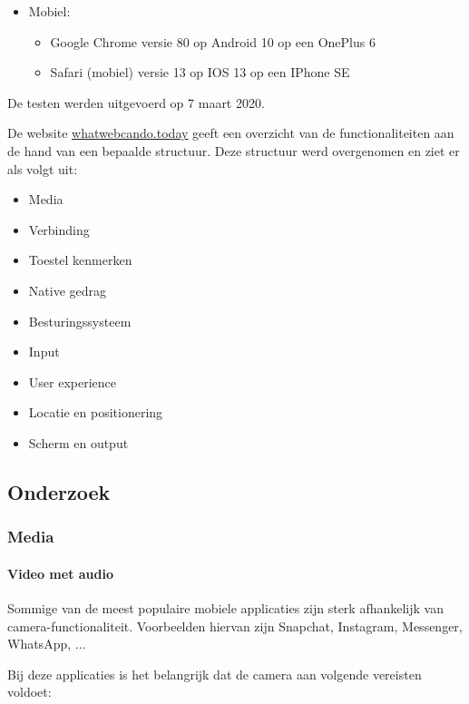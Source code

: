 \begin{itemize}
   \item Mobiel:
   \begin{itemize}
     \item Google Chrome versie 80 op Android 10 op een OnePlus 6
     \item Safari (mobiel) versie 13 op IOS 13 op een IPhone SE 
     
   \end{itemize}
\end{itemize}

De testen werden uitgevoerd op 7 maart 2020.

De website \href{https://whatwebcando.today/}{whatwebcando.today} geeft een overzicht van de functionaliteiten aan de hand van een bepaalde structuur. Deze structuur werd overgenomen en ziet er als volgt uit:
   \begin{itemize}
     \item	Media
     \item	Verbinding
     \item	Toestel kenmerken
     \item	Native gedrag
     \item	Besturingssysteem
     \item	Input
     \item	User experience
     \item	Locatie en positionering
     \item	Scherm en output
   \end{itemize}

\subsection{Onderzoek}

\subsubsection{Media}

\paragraph{Video met audio }

Sommige van de meest populaire mobiele applicaties zijn sterk afhankelijk van camera-functionaliteit. Voorbeelden hiervan zijn Snapchat, Instagram, Messenger, WhatsApp, ...

Bij deze applicaties is het belangrijk dat de camera aan volgende vereisten voldoet:

